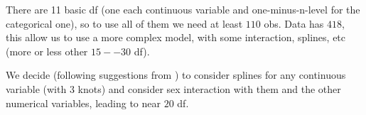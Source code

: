 \documentclass[]{book}
\newenvironment{Shaded}{\begin{snugshade}}{\end{snugshade}}
\newcommand{\KeywordTok}[1]{\textcolor[rgb]{0.13,0.29,0.53}{\textbf{{#1}}}}
\newcommand{\DataTypeTok}[1]{\textcolor[rgb]{0.13,0.29,0.53}{{#1}}}
\newcommand{\DecValTok}[1]{\textcolor[rgb]{0.00,0.00,0.81}{{#1}}}
\newcommand{\StringTok}[1]{\textcolor[rgb]{0.31,0.60,0.02}{{#1}}}
\newcommand{\CommentTok}[1]{\textcolor[rgb]{0.56,0.35,0.01}{\textit{{#1}}}}
\newcommand{\NormalTok}[1]{{#1}}
\theoremstyle{definition}
\theoremstyle{definition}
\theoremstyle{definition}
\theoremstyle{remark}
\begin{document}
There are 11 basic df (one each continuous variable and
one-minus-n-level for the categorical one), so to use all of them we
need at least \(110\) obs. Data has \(418\), this allow us to use a more
complex model, with some interaction, splines, etc (more or less other
\(15 -- 30\) df).

We decide (following suggestions from \citet{harrell2015regression}) to
consider splines for any continuous variable (with 3 knots) and consider
sex interaction with them and the other numerical variables, leading to
near \(20\) df.

\begin{Shaded}
\end{Shaded}
\end{document}
